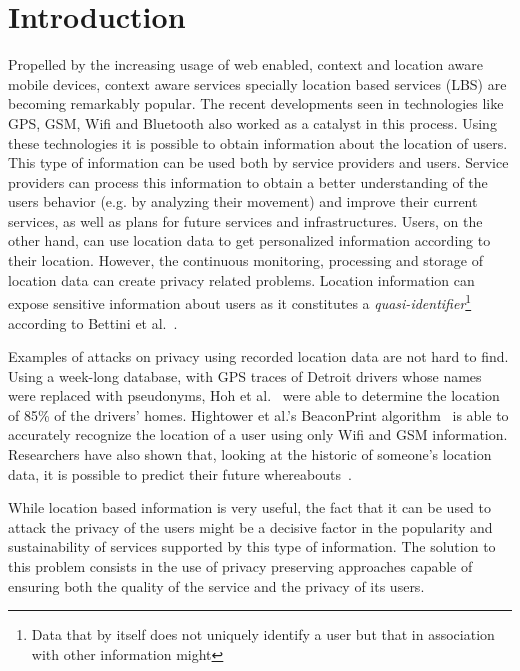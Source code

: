 \chapter{Introduction}
\label{cha:introduction}

Propelled by the increasing usage of web enabled, context and location
aware mobile devices, context aware services specially location based
services (LBS) are becoming remarkably popular. The recent
developments seen in technologies like GPS, GSM, Wifi and Bluetooth
also worked as a catalyst in this process. Using these technologies it
is possible to obtain information about the location of users. This
type of information can be used both by service providers and
users. Service providers can process this information to obtain a
better understanding of the users behavior (e.g. by analyzing their
movement) and improve their current services, as well as plans for
future services and infrastructures. Users, on the other hand, can use
location data to get personalized information according to their
location. However, the continuous monitoring, processing and storage
of location data can create privacy related problems. Location
information can expose sensitive information about users as it
constitutes a \emph{quasi-identifier}\footnote{Data that by itself
  does not uniquely identify a user but that in association with other
  information might} according to Bettini et
al.~\cite{bettini2005protecting}.

Examples of attacks on privacy using recorded location data are not
hard to find. Using a week-long database, with GPS traces of Detroit
drivers whose names were replaced with pseudonyms, Hoh et
al.~\cite{hoh2006enhancing} were able to determine the location of
85\% of the drivers' homes. Hightower et al.'s BeaconPrint
algorithm~\cite{hightower2005learning} is able to accurately recognize
the location of a user using only Wifi and GSM
information. Researchers have also shown that, looking at the historic
of someone's location data, it is possible to predict their future
whereabouts~\cite{krumm2006predestination,froehlich2008route}.

While location based information is very useful, the fact that it can
be used to attack the privacy of the users might be a decisive factor
in the popularity and sustainability of services supported by this
type of information.  The solution to this problem consists in the use
of privacy preserving approaches capable of ensuring both the quality
of the service and the privacy of its users.


